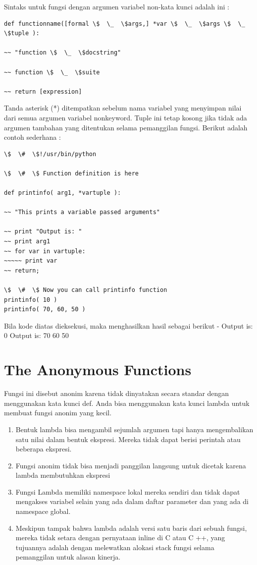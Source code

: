 Sintaks untuk fungsi dengan argumen variabel non-kata kunci adalah ini :
\begin{verbatim}
def functionname([formal \$  \_  \$args,] *var \$  \_  \$args \$  \_  \$tuple ): 

~~ "function \$  \_  \$docstring" 

~~ function \$  \_  \$suite 

~~ return [expression]
\end{verbatim}
Tanda asterisk (*) ditempatkan sebelum nama variabel yang menyimpan nilai dari semua argumen variabel nonkeyword. Tuple ini tetap kosong jika tidak ada argumen tambahan yang ditentukan selama pemanggilan fungsi. Berikut adalah contoh sederhana : 
\begin{verbatim}
\$  \#  \$!/usr/bin/python 

\$  \#  \$ Function definition is here 

def printinfo( arg1, *vartuple ): 

~~ "This prints a variable passed arguments" 

~~ print "Output is: " 
~~ print arg1
~~ for var in vartuple:
~~~~~ print var 
~~ return; 

\$  \#  \$ Now you can call printinfo function
printinfo( 10 ) 
printinfo( 70, 60, 50 ) 
\end{verbatim}
Bila kode diatas dieksekusi, maka menghasilkan hasil sebagai berikut - 
Output is: 
0
Output is: 
70 
60 
50 
\section{The Anonymous Functions} 
Fungsi ini disebut anonim karena tidak dinyatakan secara standar dengan menggunakan kata kunci def. Anda bisa menggunakan kata kunci lambda untuk membuat fungsi anonim yang kecil. 

\begin{enumerate}
\item Bentuk lambda bisa mengambil sejumlah argumen tapi hanya mengembalikan satu nilai dalam bentuk ekspresi. Mereka tidak dapat berisi perintah atau beberapa ekspresi. 
\item Fungsi anonim tidak bisa menjadi panggilan langsung untuk dicetak karena lambda membutuhkan ekspresi 
\item  Fungsi Lambda memiliki namespace lokal mereka sendiri dan tidak dapat mengakses variabel selain yang ada dalam daftar parameter dan yang ada di namespace global. 
\item Meskipun tampak bahwa lambda adalah versi satu baris dari sebuah fungsi, mereka tidak setara dengan pernyataan inline di C atau C ++, yang tujuannya adalah dengan melewatkan alokasi stack fungsi selama pemanggilan untuk alasan kinerja. 
\end{enumerate}


